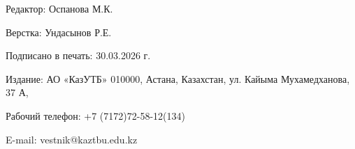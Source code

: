 \newpage

\thispagestyle{empty}
\null
\vfill
\begin{center}
Редактор: Оспанова М.К.

Верстка: Ундасынов Р.Е.

Подписано в печать: 30.03.2026 г.

Издание: АО «КазУТБ» 010000, Астана, Казахстан, ул. Кайыма Мухамедханова, 37 А,

Рабочий телефон: +7 (7172)72-58-12(134)

E-mail: vestnik@kaztbu.edu.kz
\end{center}
\vfill
\null
